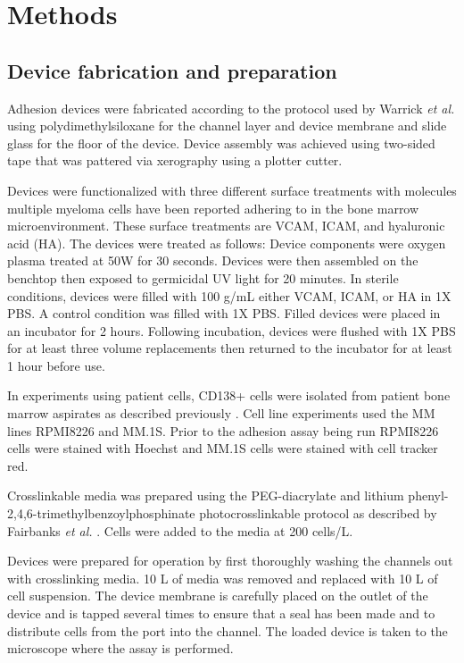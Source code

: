 \section{Methods}

\subsection{Device fabrication and preparation}
Adhesion devices were fabricated according to the protocol used by Warrick \textit{et al.} \cite{Warrick2013} using polydimethylsiloxane for the channel layer and device membrane and slide glass for the floor of the device. Device assembly was achieved using two-sided tape that was pattered via xerography using a plotter cutter.

Devices were functionalized with three different surface treatments with molecules multiple myeloma cells have been reported adhering to in the bone marrow microenvironment. These surface treatments are VCAM, ICAM, and hyaluronic acid (HA). The devices were treated as follows: Device components were oxygen plasma treated at 50W for 30 seconds. Devices were then assembled on the benchtop then exposed to germicidal UV light for 20 minutes. In sterile conditions, devices were filled with 100 \textmu g/mL either VCAM, ICAM, or HA in 1X PBS. A control condition was filled with 1X PBS. Filled devices were placed in an incubator for 2 hours. Following incubation, devices were flushed with 1X PBS for at least three volume replacements then returned to the incubator for at least 1 hour before use.

In experiments using patient cells, CD138+ cells were isolated from patient bone marrow aspirates as described previously \cite{Pak2015}. Cell line experiments used the MM lines RPMI8226 and MM.1S. Prior to the adhesion assay being run RPMI8226 cells were stained with Hoechst and MM.1S cells were stained with cell tracker red. 

Crosslinkable media was prepared using the PEG-diacrylate and lithium phenyl-2,4,6-trimethylbenzoylphosphinate photocrosslinkable protocol as described by Fairbanks \textit{et al. } \cite{Fairbanks2009}. Cells were added to the media at 200 cells/\textmu L.

Devices were prepared for operation by first thoroughly washing the channels out with crosslinking media. 10 \textmu L of media was removed and replaced with 10 \textmu L of cell suspension. The device membrane is carefully placed on the outlet of the device and is tapped several times to ensure that a seal has been made and to distribute cells from the port into the channel. The loaded device is taken to the microscope where the assay is performed. 



